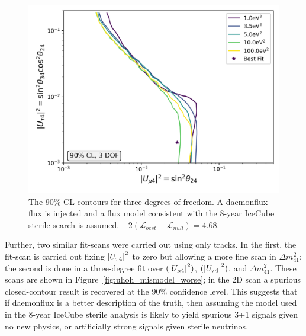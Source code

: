 \documentclass[main.tex]{subfiles}
\begin{document}
\begin{figure}  
    \centering
    \includegraphics[width=0.7\linewidth]{figures/joint_daemon_mismodel_Realization_daemon_Asimov_sterile_0_cl0.9_dof3.png}
    \caption{The 90\% CL contours for three degrees of freedom. A daemonflux flux is injected and a flux model consistent with the 8-year IceCube sterile search is assumed. $-2(\mathcal{L}_{best}-\mathcal{L}_{null})=4.68$.}\label{fig:uhoh_mismodel}
\end{figure}

Further, two similar fit-scans were carried out using only tracks. 
In the first, the fit-scan is carried out fixing $\left| U_{\tau 4} \right|^{2}$ to zero but allowing a more fine scan in $\Delta m_{41}^{2}$; the second is done in a three-degree fit over $(\left| U_{\mu 4} \right|^{2})$, $(\left| U_{\tau 4} \right|^{2})$, and $\Delta m_{41}^{2}$. 
These scans are shown in Figure~\ref{fig:uhoh_mismodel_worse}; in the 2D scan a spurious closed-contour result is recovered at the 90\% confidence level. 
This suggests that if daemonflux is a better description of the truth, then assuming the model used in the 8-year IceCube sterile analysis is likely to yield spurious 3+1 signals given no new physics, or artificially strong signals given sterile neutrinos.
\end{document}
